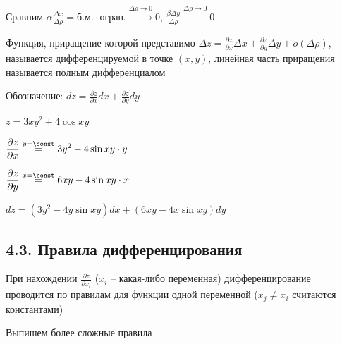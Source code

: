 \documentclass[12pt]{article}
\begin{document}
    Сравним $\displaystyle \alpha \frac{\Delta x}{\Delta \rho} = \text{б.м.} \cdot \text{огран.} \stackrel{\Delta \rho \to 0}{\to} 0$, $\displaystyle \frac{\beta \Delta y}{\Delta \rho} \stackrel{\Delta \rho \to 0}{\to} 0$

    Функция, приращение которой представимо $\displaystyle \Delta z = \frac{\partial z}{\partial x}\Delta x + \frac{\partial z}{\partial y}\Delta y + o(\Delta \rho)$, называется дифференцируемой в точке $\displaystyle (x, y)$,
    линейная часть приращения называется полным дифференциалом

    Обозначение: $\displaystyle dz = \frac{\partial z}{\partial x} dx + \frac{\partial z}{\partial y} dy$

    \Ex $\displaystyle z = 3xy^2 + 4\cos xy$

    $\displaystyle \frac{\partial z}{\partial x} \stackrel{y = \const}{=} 3y^2 - 4\sin xy \cdot y$

    $\displaystyle \frac{\partial z}{\partial y} \stackrel{x = \const}{=} 6xy - 4\sin xy \cdot x$

    $\displaystyle dz = (3y^2 - 4y \sin xy)dx + (6xy - 4x \sin xy)dy$

    \subsection{4.3. Правила дифференцирования}

    \Nota При нахождении $\displaystyle \frac{\partial z}{\partial x_i}$ ($x_i$ -- какая-либо переменная) дифференцирование проводится по правилам для функции одной переменной ($x_j \neq x_i$ считаются константами)

    Выпишем более сложные правила

    \hypertarget{derivativeofcomplexfunctionoftwovariables}{}
\end{document}
